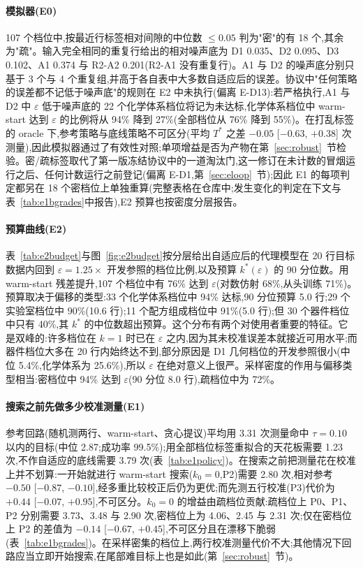 \documentclass[11pt,a4paper]{ctexart}
\begin{document}
\paragraph{模拟器(E0)} 107 个档位中,按最近行标签相对间隙的中位数 $\le 0.05$ 判为"密"的有 18 个,其余为"疏"。输入完全相同的重复行给出的相对噪声底为 D1 0.035、D2 0.095、D3 0.102、A1 0.374 与 R2-A2 0.201(R2-A1 没有重复行)。A1 与 D2 的噪声底分别只基于 3 个与 4 个重复组,并高于各自表中大多数自适应后的误差。协议中"任何策略的误差都不记低于噪声底"的规则在 E2 中未执行(偏离 E-D13):若严格执行,A1 与 D2 中 $\varepsilon$ 低于噪声底的 22 个化学体系档位将记为未达标,化学体系档位中 warm-start 达到 $\varepsilon$ 的比例将从 94\% 降到 27\%(全部档位从 76\% 降到 55\%)。在打乱标签的 oracle 下,参考策略与底线策略不可区分(平均 $T^{*}$ 之差 $-0.05$ [$-0.63$, $+0.38$] 次测量),因此模拟器通过了有效性对照;单项增益是否为产物在第~\ref{sec:robust}~节检验。密/疏标签取代了第一版冻结协议中的一道淘汰门,这一修订在未计数的冒烟运行之后、任何计数运行之前登记(偏离 E-D1,第~\ref{sec:eloop}~节);因此 E1 的每项判定都另在 18 个密档位上单独重算(完整表格在仓库中;发生变化的判定在下文与表~\ref{tab:e1bgrades}中报告),E2 预算也按密度分层报告。

\paragraph{预算曲线(E2)} 表~\ref{tab:e2budget}与图~\ref{fig:e2budget}按分层给出自适应后的代理模型在 20 行目标数据内回到 $\varepsilon = 1.25 \times$ 开发参照的档位比例,以及预算 $k^{*}(\varepsilon)$ 的 90 分位数。用 warm-start 残差提升,107 个档位中有 76\% 达到 $\varepsilon$(对数仿射 68\%,从头训练 71\%)。预算取决于偏移的类型:33 个化学体系档位中 94\% 达标,90 分位预算 5.0 行;29 个实验室档位中 90\%(10.6 行);11 个配方组成档位中 91\%(5.0 行);但 30 个器件档位中只有 40\%,其 $k^{*}$ 的中位数超出预算。这个分布有两个对使用者重要的特征。它是双峰的:许多档位在 $k = 1$ 时已在 $\varepsilon$ 之内,因为其未校准误差本就接近可用水平;而器件档位大多在 20 行内始终达不到,部分原因是 D1 几何档位的开发参照很小(中位 5.4\%,化学体系为 25.6\%),所以 $\varepsilon$ 在绝对意义上很严。采样密度的作用与偏移类型相当:密档位中 94\% 达到 $\varepsilon$(90 分位 8.0 行),疏档位中为 72\%。

\paragraph{搜索之前先做多少校准测量(E1)} 参考回路(随机测两行、warm-start、贪心提议)平均用 3.31 次测量命中 $\tau = 0.10$ 以内的目标(中位 2.87;成功率 99.5\%);用全部档位标签重拟合的天花板需要 1.23 次,不作自适应的底线需要 3.79 次(表~\ref{tab:e1policy})。在搜索之前把测量花在校准上并不划算:一开始就进行 warm-start 搜索($k_0 = 0$,P2)需要 2.80 次,相对参考 $-0.50$ [$-0.87$, $-0.10$],经多重比较校正后仍为更优;而先测五行校准(P3)代价为 $+0.44$ [$-0.07$, $+0.95$],不可区分。$k_0 = 0$ 的增益由疏档位贡献:疏档位上 P0、P1、P2 分别需要 3.73、3.48 与 2.90 次,密档位上为 4.06、2.45 与 2.31 次;仅在密档位上 P2 的差值为 $-0.14$ [$-0.67$, $+0.45$],不可区分且在漂移下脆弱(表~\ref{tab:e1bgrades})。在采样密集的档位上,两行校准测量代价不大;其他情况下回路应当立即开始搜索,在尾部难目标上也是如此(第~\ref{sec:robust}~节)。
\end{document}
